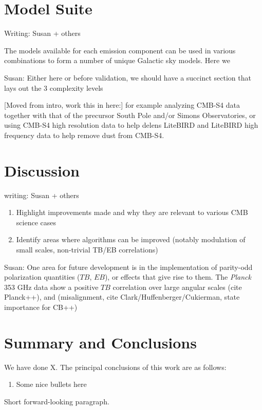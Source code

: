 \documentclass[twocolumn]{aastex631}
\begin{document}
\section{Model Suite}\label{sec:modelsuite}
Writing: Susan + others

The models available for each emission component can be used in various combinations to form a number of unique Galactic sky models. Here we 

Susan: Either here or before validation, we should have a succinct section that lays out the 3 complexity levels

[Moved from intro, work this in here:]
for example analyzing CMB-S4 data together with that of the precursor South Pole and/or Simons Observatories, or using CMB-S4 high resolution data to help delens LiteBIRD and LiteBIRD high frequency data to help remove dust from CMB-S4.


\section{Discussion} \label{sec:discussion}
writing: Susan + others

\begin{enumerate}
    \item Highlight improvements made and why they are relevant to various CMB science cases
    \item Identify areas where algorithms can be improved (notably modulation of small scales, non-trivial TB/EB correlations)
\end{enumerate}

Susan:
One area for future development is in the implementation of parity-odd polarization quantities ($TB$, $EB$), or effects that give rise to them. The \textit{Planck} 353 GHz data show a positive $TB$ correlation over large angular scales (cite Planck++), and (misalignment, cite Clark/Huffenberger/Cukierman, state importance for CB++)

\section{Summary and Conclusions} \label{sec:summary}

We have done X. The principal conclusions of this work are as follows:

\begin{enumerate}
    \item Some nice bullets here
\end{enumerate}

Short forward-looking paragraph.


\end{document}
